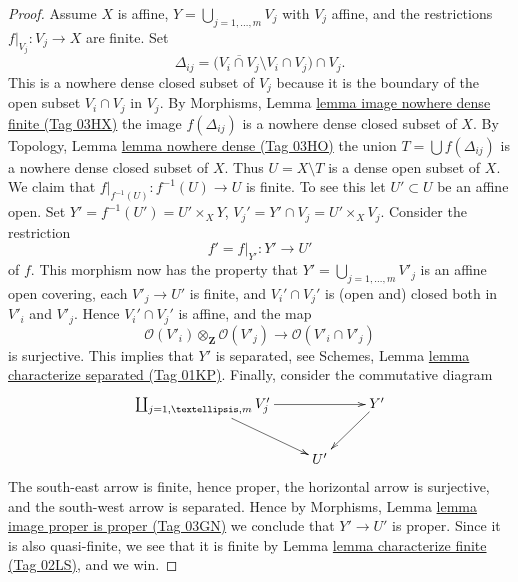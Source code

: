 \documentclass{amsart}
\theoremstyle{plain}
\theoremstyle{definition}
\theoremstyle{remark}
\numberwithin{equation}{subsection}
\begin{document}
\begin{proof}
\medskip\noindent
Assume $X$ is affine, $Y = \bigcup_{j = 1, \ldots, m} V_j$ with $V_j$ affine,
and the restrictions $f|_{V_j} : V_j \to X$ are finite.
Set
$$
\Delta_{ij} =
\Big(\overline{V_i \cap V_j} \setminus V_i \cap V_j\Big) \cap V_j.
$$
This is a nowhere dense closed subset of $V_j$ because it is the boundary
of the open subset $V_i \cap V_j$ in $V_j$. By
Morphisms, Lemma \href{https://stacks.math.columbia.edu/tag/03HX}{lemma image nowhere dense finite (Tag 03HX)}
the image $f(\Delta_{ij})$ is a nowhere dense closed subset of $X$. By
Topology, Lemma \href{https://stacks.math.columbia.edu/tag/03HO}{lemma nowhere dense (Tag 03HO)}
the union $T = \bigcup f(\Delta_{ij})$ is a nowhere dense closed
subset of $X$. Thus $U = X \setminus T$ is a dense open subset of $X$.
We claim that $f|_{f^{-1}(U)} : f^{-1}(U) \to U$ is finite.
To see this let $U' \subset U$ be an affine open.
Set $Y' = f^{-1}(U') = U' \times_X Y$,
$V_j' = Y' \cap V_j = U' \times_X V_j$. Consider the restriction
$$
f' = f|_{Y'} : Y' \longrightarrow U'
$$
of $f$. This morphism now has the property that
$Y' = \bigcup_{j = 1, \ldots, m} V'_j$ is an affine open covering,
each $V'_j \to U'$ is finite, and $V_i' \cap V_j'$ is (open and) closed
both in $V'_i$ and $V'_j$. Hence $V_i' \cap V_j'$ is affine, and the map
$$
\mathcal{O}(V'_i) \otimes_{\mathbf{Z}} \mathcal{O}(V'_j)
\longrightarrow
\mathcal{O}(V'_i \cap V'_j)
$$
is surjective. This implies that $Y'$ is separated, see
Schemes, Lemma \href{https://stacks.math.columbia.edu/tag/01KP}{lemma characterize separated (Tag 01KP)}.
Finally, consider the commutative diagram
$$
\xymatrix{
\coprod_{j = 1, \ldots, m} V'_j \ar[rd] \ar[rr] & & Y' \ar[ld] \\
& U' &
}
$$
The south-east arrow is finite, hence proper, the horizontal arrow is
surjective, and the south-west arrow is separated. Hence by
Morphisms, Lemma \href{https://stacks.math.columbia.edu/tag/03GN}{lemma image proper is proper (Tag 03GN)}
we conclude that $Y' \to U'$ is proper. Since it is also quasi-finite,
we see that it is finite by Lemma \href{https://stacks.math.columbia.edu/tag/02LS}{lemma characterize finite (Tag 02LS)},
and we win.
\end{proof}
\end{document}
